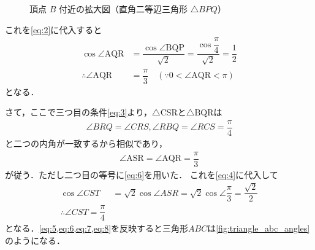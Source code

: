 \documentclass[../../main.tex]{subfiles}
\begin{document}
\begin{figure}[htb]
  \caption{頂点 $B$ 付近の拡大図（直角二等辺三角形 $\triangle BPQ$）}
  \label{fig:triangle_bpq}
\end{figure}

これを\cref{eq:2}に代入すると
\begin{align}
  \cos\angle \mathrm{AQR}
  &= \dfrac{\cos\angle \mathrm{BQP}}{\sqrt{2}} = \dfrac{\cos\dfrac{\pi}{4}}{\sqrt{2}} = \dfrac{1}{2} \\
  \therefore
  \angle \mathrm{AQR} &= \dfrac{\pi}{3} \quad \left(\because 0 < \angle \mathrm{AQR} < \pi\right) \label{eq:6}
\end{align}
となる．

さて，ここで三つ目の条件\cref{eq:3}より，$\triangle \mathrm{CSR}$と$\triangle \mathrm{BQR}$は
\begin{align}
  \angle BRQ = \angle CRS, \angle RBQ = \angle RCS = \dfrac{\pi}{4}
\end{align}
と二つの内角が一致するから相似であり，
\begin{align}
  \angle \mathrm{ASR} = \angle \mathrm{AQR} = \dfrac{\pi}{3} \label{eq:7}
\end{align}
が従う．ただし二つ目の等号に\cref{eq:6}を用いた．
これを\cref{eq:4}に代入して
\begin{align}
  \cos\angle CST
  &=\sqrt{2}\cos\angle ASR = \sqrt{2}\cos\angle\dfrac{\pi}{3} = \dfrac{\sqrt{2}}{2} \\
  \therefore
  \angle CST = \dfrac{\pi}{4} \label{eq:8}
\end{align}
となる．\cref{eq:5,eq:6,eq:7,eq:8}を反映すると三角形$ABC$は\cref{fig:triangle_abc_angles}のようになる．
\end{document}
